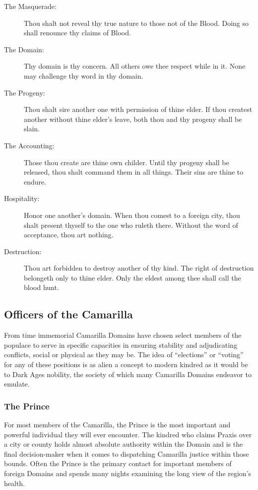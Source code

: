 \begin{description}
	\item[The Masquerade:] Thou shalt not reveal thy true nature to those not of the Blood. 
	Doing so shall renounce thy claims of Blood.
	\item[The Domain:] Thy domain is thy concern. All others owe thee respect while in it. 
	None may challenge thy word in thy domain.
	\item[The Progeny:] Thou shalt sire another one with permission of thine elder. If thou 
	createst another without thine elder's leave, both thou and thy progeny shall be slain.
	\item[The Accounting:] Those thou create are thine own childer. Until thy progeny shall be 
	released, thou shalt command them in all things. Their sins are thine to endure.
	\item[Hospitality:] Honor one another's domain. When thou comest to a foreign city, thou 
	shalt present thyself to the one who ruleth there. Without the word of acceptance, thou 
	art nothing.
	\item[Destruction:] Thou art forbidden to destroy another of thy kind. The right of 
	destruction belongeth only to thine elder. Only the eldest among thee shall call the 
	blood hunt.
\end{description}

\subsection{Officers of the Camarilla}
From time immemorial Camarilla Domains have chosen select members of the populace to serve 
in specific capacities in ensuring stability and adjudicating conflicts, social or physical 
as they may be.  The idea of ``elections'' or ``voting'' for any of these positions is as 
alien a concept to modern kindred as it would be to Dark Ages nobility, the society of which 
many Camarilla Domains endeavor to emulate.

\subsubsection{The Prince}
For most members of the Camarilla, the Prince is the most important and powerful individual 
they will ever encounter.  The kindred who claims Praxis over a city or county holds almost 
absolute authority within the Domain and is the final decision-maker when it comes to dispatching 
Camarilla justice within those bounds.  Often the Prince is the primary contact for important 
members of foreign Domains and spends many nights examining the long view of the region's health.

